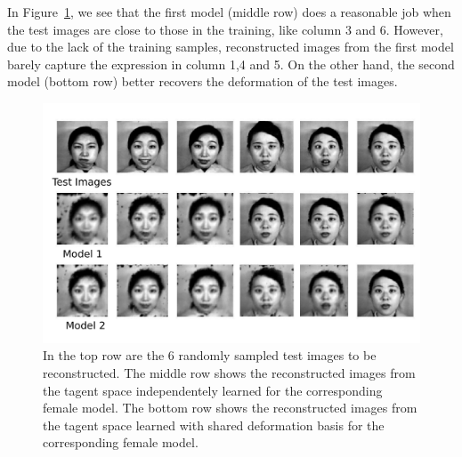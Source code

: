 \documentclass[runningheads]{llncs}
\begin{document}
In Figure~\ref{fig:v3}, we see that the first model (middle row) does a reasonable job when the test images are close to those in the training, like column 3 and 6. However, due to the lack of the training samples, reconstructed images from the first model barely capture the expression in column 1,4 and 5. On the other hand, the second model (bottom row) better recovers the deformation of the test images. 
\begin{figure}[t]
    \centering
    \includegraphics[height=0.6\columnwidth]{figs/V3.pdf}
    \caption{In the top row are the 6 randomly sampled test images to be reconstructed. The middle row shows the reconstructed images from the tagent space independentely learned for the corresponding female model. The bottom row shows the reconstructed images from the tagent space learned with shared deformation basis for the corresponding female model.}
    \label{fig:v3}
\end{figure}




\end{document}
